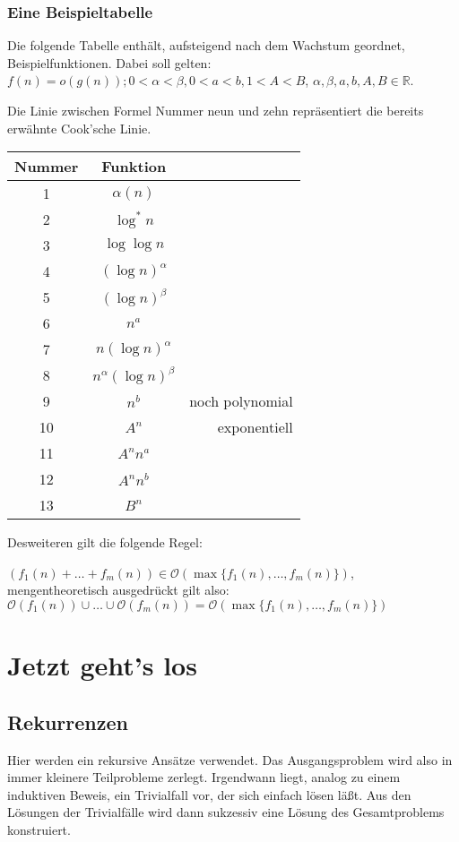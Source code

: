 \documentclass[ngerman,draft,parskip=half*,twoside]{scrreprt}
\theoremstyle{break}
\theoremstyle{nonumberbreak}
\newcommand*{\OO}{\mathcal{O}}      %
\newcommand*{\R}{\mathbb{R}}        %
\begin{document}
\subsection{Eine Beispieltabelle}
Die folgende Tabelle enthält, aufsteigend nach dem Wachstum geordnet, Beispielfunktionen.
Dabei soll gelten: $f(n)=o(g(n));0 < \alpha < \beta,0<a<b,1<A<B$,
$\alpha,\beta,a, b, A, B \in \R$.

Die Linie zwischen Formel Nummer neun und zehn repräsentiert die bereits erwähnte Cook'sche Linie.


\begin{table}[h]
\begin{tabular}{c|cr}
    Nummer      &Funktion       \\ \hline
    1   &       $\alpha (n)$    \\
    2   &       $\log^{*}n$     \\
    3   &       $\log \log n $  \\
    4   &       ${(\log n)}^{\alpha}$ \\
    5   &       ${(\log n)}^{\beta}$  \\
    6   &       $n^a$           \\
    7   &       $n (\log n)^{\alpha}$      \\
    8   &       $n^{\alpha}{(\log n)}^{\beta}$  \\
    9   &       $n^b$           & noch polynomial\\ \hline
    10  &       $A^n$           & exponentiell\\
    11  &       $A^n n^a$       \\
    12  &       $A^n n^b$       \\
    13  &       $B^n$           
\end{tabular}
\end{table}

Desweiteren gilt die folgende Regel:

$(f_1(n)+ \dots +f_m(n)) \in \OO (\max\{f_1(n),\dots,f_m(n)\})$, mengentheoretisch ausgedrückt gilt also: $\OO(f_1(n)) \cup \dots
\cup \OO(f_m(n)) = \OO (\max\{f_1(n),\dots,f_m(n)\})$


\chapter{Jetzt geht's los}

\section{Rekurrenzen}
Hier werden ein rekursive Ansätze verwendet. Das Ausgangsproblem wird also in immer kleinere Teilprobleme zerlegt.
Irgendwann liegt, analog zu einem induktiven Beweis, ein Trivialfall vor, der sich einfach lösen läßt. Aus den Lösungen der Trivialfälle
wird dann sukzessiv eine Lösung des Gesamtproblems konstruiert.
\end{document}
